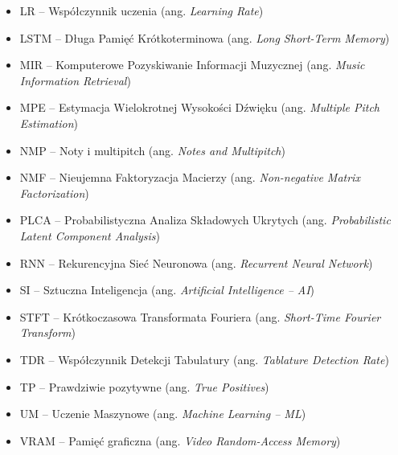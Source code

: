 \begin{itemize}
    \item LR – Współczynnik uczenia (ang. \textit{Learning Rate})
    \item LSTM – Długa Pamięć Krótkoterminowa (ang. \textit{Long Short-Term Memory})
    \item MIR – Komputerowe Pozyskiwanie Informacji Muzycznej (ang. \textit{Music Information Retrieval})
    \item MPE – Estymacja Wielokrotnej Wysokości Dźwięku (ang. \textit{Multiple Pitch Estimation})
    \item NMP – Noty i multipitch (ang. \textit{Notes and Multipitch})
    \item NMF – Nieujemna Faktoryzacja Macierzy (ang. \textit{Non-negative Matrix Factorization})
    \item PLCA – Probabilistyczna Analiza Składowych Ukrytych (ang. \textit{Probabilistic Latent Component Analysis})
    \item RNN – Rekurencyjna Sieć Neuronowa (ang. \textit{Recurrent Neural Network})
    \item SI – Sztuczna Inteligencja (ang. \textit{Artificial Intelligence – AI})
    \item STFT – Krótkoczasowa Transformata Fouriera (ang. \textit{Short-Time Fourier Transform})
    \item TDR – Współczynnik Detekcji Tabulatury (ang. \textit{Tablature Detection Rate})
    \item TP – Prawdziwie pozytywne (ang. \textit{True Positives})
    \item UM – Uczenie Maszynowe (ang. \textit{Machine Learning – ML})
    \item VRAM – Pamięć graficzna (ang. \textit{Video Random-Access Memory})
\end{itemize}


